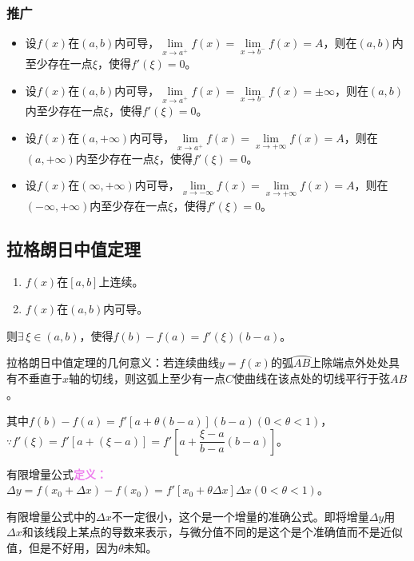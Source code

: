 \documentclass[UTF8, 12pt]{ctexart}
\begin{document}
        \subsubsection{推广}

        \begin{itemize}
            \item 设$f(x)$在$(a,b)$内可导，$\lim\limits_{x\to a^+}f(x)=\lim\limits_{x\to b^-}f(x)=A$，则在$(a,b)$内至少存在一点$\xi$，使得$f'(\xi)=0$。
            \item 设$f(x)$在$(a,b)$内可导，$\lim\limits_{x\to a^+}f(x)=\lim\limits_{x\to b^-}f(x)=\pm\infty$，则在$(a,b)$内至少存在一点$\xi$，使得$f'(\xi)=0$。
            \item 设$f(x)$在$(a,+\infty)$内可导，$\lim\limits_{x\to a^+}f(x)=\lim\limits_{x\to+\infty}f(x)=A$，则在$(a,+\infty)$内至少存在一点$\xi$，使得$f'(\xi)=0$。
            \item 设$f(x)$在$(\infty,+\infty)$内可导，$\lim\limits_{x\to-\infty}f(x)=\lim\limits_{x\to+\infty}f(x)=A$，则在$(-\infty,+\infty)$内至少存在一点$\xi$，使得$f'(\xi)=0$。
        \end{itemize}

        \subsection{拉格朗日中值定理}

        \begin{enumerate}
            \item $f(x)$在$[a,b]$上连续。
            \item $f(x)$在$(a,b)$内可导。
        \end{enumerate}

        则$\exists\,\xi\in(a,b)$，使得$f(b)-f(a)=f'(\xi)(b-a)$。

        拉格朗日中值定理的几何意义：若连续曲线$y=f(x)$的弧$\wideparen{AB}$上除端点外处处具有不垂直于$x$轴的切线，则这弧上至少有一点$C$使曲线在该点处的切线平行于弦$AB$。

        其中$f(b)-f(a)=f'[a+\theta(b-a)](b-a)(0<\theta<1)$，$\because f'(\xi)=f'[a+(\xi-a)]=f'[a+\dfrac{\xi-a}{b-a}(b-a)]$。\medskip

        有限增量公式\textcolor{violet}{\textbf{定义：}}$\Delta y=f(x_0+\Delta x)-f(x_0)=f'[x_0+\theta\Delta x]\Delta x(0<\theta<1)$。

        有限增量公式中的$\Delta x$不一定很小，这个是一个增量的准确公式。即将增量$\Delta y$用$\Delta x$和该线段上某点的导数来表示，与微分值不同的是这个是个准确值而不是近似值，但是不好用，因为$\theta$未知。
\end{document}
